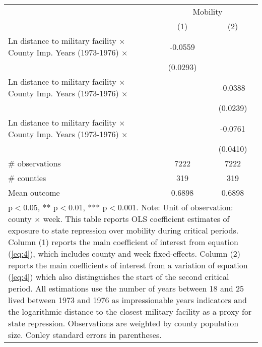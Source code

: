 {
\def\sym#1{\ifmmode^{#1}\else\(^{#1}\)\fi}
\begin{tabular}{l*{2}{c}}
\hline\hline
                    &\multicolumn{2}{c}{Mobility}               \\\cmidrule(lr){2-3}
                    &\multicolumn{1}{c}{(1)}         &\multicolumn{1}{c}{(2)}         \\
\hline
Ln distance to military facility $\times$ County Imp. Years (1973-1976) $\times$&     -0.0559         &                     \\
                    &    (0.0293)         &                     \\
[1em]
Ln distance to military facility $\times$ County Imp. Years (1973-1976) $\times$&                     &     -0.0388         \\
                    &                     &    (0.0239)         \\
[1em]
Ln distance to military facility $\times$ County Imp. Years (1973-1976) $\times$&                     &     -0.0761         \\
                    &                     &    (0.0410)         \\
\hline
\# observations     &        7222         &        7222         \\
\# counties         &         319         &         319         \\
Mean outcome        &      0.6898         &      0.6898         \\
\hline\hline \multicolumn{3}{p{25cm}}{\footnotesize * p$<$0.05, ** p$<$0.01, *** p$<$0.001. Note: Unit of observation: county $\times$ week. This table reports OLS coefficient estimates of exposure to state repression over mobility during critical periods. Column (1) reports the main coefficient of interest from equation (\ref{eq:4}), which includes county and week fixed-effects. Column (2) reports the main coefficients of interest from a variation of equation (\ref{eq:4}) which also distinguishes the start of the second critical period. All estimations use the number of years between 18 and 25 lived between 1973 and 1976 as impressionable years indicators and the logarithmic distance to the closest military facility as a proxy for state repression. Observations are weighted by county population size. Conley standard errors in parentheses.}\\ \end{tabular} } %
